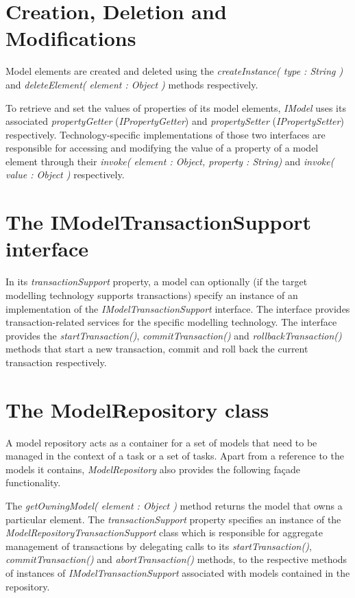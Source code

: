 \section{Creation, Deletion and Modifications}
\label{sec:Design.EMC.CRUD}

Model elements are created and deleted using the \emph{createInstance( type : String )} and \emph{deleteElement( element : Object )} methods respectively.

To retrieve and set the values of properties of its model elements, \emph{IModel} uses its associated \emph{propertyGetter} (\emph{IPropertyGetter}) and \emph{propertySetter} (\emph{IPropertySetter}) respectively. Technology-specific implementations of those two interfaces are responsible for accessing and modifying the value of a property of a model element through their \emph{invoke( element : Object, property : String)} and \emph{invoke( value : Object )} respectively.

\section{The IModelTransactionSupport interface}
\label{sec:EMC.ModelTransactionSupport}
In its \emph{transactionSupport} property, a model can optionally (if the target modelling technology supports transactions) specify an instance of an implementation of the \emph{IModelTransactionSupport} interface. The interface provides transaction-related services for the specific modelling technology. The interface provides the \emph{startTransaction()}, \emph{commitTransaction()} and \emph{rollbackTransaction()} methods that start a new transaction, commit and roll back the current transaction respectively.

\section{The ModelRepository class}

A model repository acts as a container for a set of models that need to be managed in the context of a task or a set of tasks. Apart from a reference to the models it contains, \emph{ModelRepository} also provides the following fa\c{c}ade functionality.

The \emph{getOwningModel( element : Object )} method returns the model that owns a particular element. The \emph{transactionSupport} property specifies an instance of the \emph{ModelRepositoryTransactionSupport} class which is responsible for aggregate management of transactions by delegating calls to its \emph{startTransaction()}, \emph{commitTransaction()} and \emph{abortTransaction()} methods, to the respective methods of instances of \emph{IModelTransactionSupport} associated with models contained in the repository.

